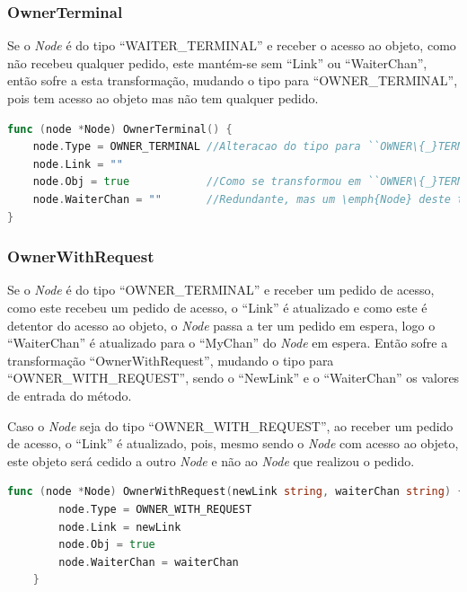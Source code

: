 \subsubsection*{OwnerTerminal}

Se o \emph{Node} é do tipo ``WAITER\_TERMINAL'' e receber o acesso ao objeto, como
não recebeu qualquer pedido, este mantém-se sem ``Link'' ou ``WaiterChan'', 
então sofre a esta transformação, mudando o tipo para ``OWNER\_TERMINAL'', pois tem acesso ao objeto mas não tem qualquer pedido.

\begin{lstlisting}[caption={Método/transformação ``OwnerTerminal''},language=Go]
func (node *Node) OwnerTerminal() {
	node.Type = OWNER_TERMINAL //Alteracao do tipo para ``OWNER\{_}TERMINAL''
	node.Link = ""             
	node.Obj = true			   //Como se transformou em ``OWNER\{_}TERMINAL'' significa que passou a deter o acesso ao objeto
	node.WaiterChan = ""       //Redundante, mas um \emph{Node} deste tipo nao tem \emph{Node} a espera do acesso ao objeto
}
\end{lstlisting}

\subsubsection*{OwnerWithRequest}

Se o \emph{Node} é do tipo ``OWNER\_TERMINAL'' e receber um pedido de acesso, 
como este recebeu um pedido de acesso, o ``Link'' é atualizado e
como este é detentor do acesso ao objeto, o \emph{Node} passa a ter um pedido em espera, logo o ``WaiterChan'' é atualizado para o ``MyChan'' do \emph{Node} em espera.
Então sofre a transformação ``OwnerWithRequest'', mudando o tipo para ``OWNER\_WITH\_REQUEST'', sendo o ``NewLink'' e o ``WaiterChan'' os valores de entrada do método.

Caso o \emph{Node} seja do tipo ``OWNER\_WITH\_REQUEST'', ao receber um pedido de acesso, 
o ``Link'' é atualizado, pois, mesmo sendo o \emph{Node} com acesso ao objeto, este objeto será cedido a outro \emph{Node} e não ao
\emph{Node} que realizou o pedido.

\begin{lstlisting}[caption={Método/transformação ``OwnerWithRequest''},language=Go]
	func (node *Node) OwnerWithRequest(newLink string, waiterChan string) {
		node.Type = OWNER_WITH_REQUEST
		node.Link = newLink
		node.Obj = true
		node.WaiterChan = waiterChan
	}


\end{lstlisting}

